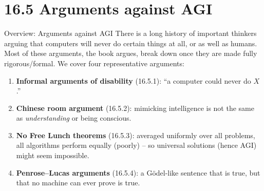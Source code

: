 \documentclass[aspectratio=169,10pt]{beamer}
\begin{document}
\section{16.5 Arguments against AGI}

\begin{frame}{Overview: Arguments against AGI}
  There is a long history of important thinkers arguing that computers will
  never do certain things at all, or as well as humans. Most of these
  arguments, the book argues, break down once they are made fully
  rigorous/formal. We cover four representative arguments:
  \begin{enumerate}
    \item \textbf{Informal arguments of disability} (16.5.1): ``a computer
      could never do $X$.''
    \item \textbf{Chinese room argument} (16.5.2): mimicking intelligence
      is not the same as \emph{understanding} or being conscious.
    \item \textbf{No Free Lunch theorems} (16.5.3): averaged uniformly over
      all problems, all algorithms perform equally (poorly) -- so universal
      solutions (hence AGI) might seem impossible.
    \item \textbf{Penrose--Lucas arguments} (16.5.4): a Gödel-like sentence
      that is true, but that no machine can ever prove is true.
  \end{enumerate}
\end{frame}
\end{document}
